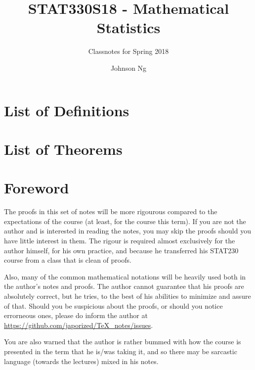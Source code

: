 \documentclass[notoc,notitlepage]{tufte-book}
\title{STAT330S18 - Mathematical Statistics}
\author{Johnson Ng}
\subtitle{Classnotes for Spring 2018}
\begin{document}
\hypersetup{pageanchor=false}
\maketitle
\hypersetup{pageanchor=true}
\tableofcontents

\chapter*{\faBook \enspace List of Definitions}

\chapter*{\faPaperclip \enspace List of Theorems}

\chapter*{Foreword}
  \label{chapter:foreword}

\begin{fullwidth}
  The proofs in this set of notes will be more rigourous compared to the expectations of the course (at least, for the course this term). If you are not the author and is interested in reading the notes, you may skip the proofs should you have little interest in them. The rigour is required almost exclusively for the author himself, for his own practice, and because he transferred his STAT230 course from a class that is clean of proofs.

  Also, many of the common mathematical notations will be heavily used both in the author's notes and proofs. The author cannot guarantee that his proofs are absolutely correct, but he tries, to the best of his abilities to minimize and assure of that. Should you be suspicious about the proofs, or should you notice errorneous ones, please do inform the author at \url{https://github.com/japorized/TeX_notes/issues}.

  You are also warned that the author is rather bummed with how the course is presented in the term that he is/was taking it, and so there may be sarcastic language (towards the lectures) mixed in his notes.
\end{fullwidth}

\end{document}
